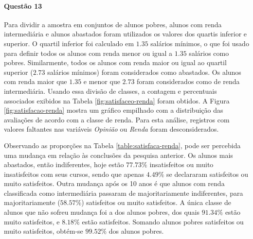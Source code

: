 \documentclass[10pt,a4paper,oneside]{article}
\begin{document}

\FloatBarrier

\paragraph{Questão 13}

Para dividir a amostra em conjuntos de alunos pobres, alunos com renda intermediária e alunos abastados foram utilizados os valores dos quartis inferior e superior. O quartil inferior foi calculado em $1.35$ salários mínimos, o que foi usado para definir todos os alunos com renda menor ou igual a $1.35$ salários como pobres. Similarmente, todos os alunos com renda maior ou igual ao quartil superior ($2.73$ salários mínimos) foram considerados como abastados. Os alunos com renda maior que $1.35$ e menor que $2.73$ foram considerados como de renda intermediária. Usando essa divisão de classes, a contagem e percentuais associados exibidos na Tabela \ref{fig:satisfaceo-renda} foram obtidos. A Figura \ref{fig:satisfacao-renda} mostra um gráfico empilhado com a distribuição das avaliações de acordo com a classe de renda. Para esta análise, registros com valores faltantes nas variáveis \textit{Opinião} ou \textit{Renda} foram desconsiderados.


Observando as proporções na Tabela \ref{table:satisfaca-renda}, pode ser percebida uma mudança em relação às conclusões da pesquisa anterior. Os alunos mais abastados, então indiferentes, hoje estão $77.73\%$ insatisfeitos ou muito insatisfeitos com seus cursos, sendo que apenas $4.49\%$ se declararam satisfeitos ou muito satisfeitos. Outra mudança após os 10 anos é que alunos com renda classificada como intermediária passaram de majoritariamente indiferentes, para majoritariamente ($58.57\%$) satisfeitos ou muito satisfeitos. A única classe de alunos que não sofreu mudança foi a dos alunos pobres, dos quais $91.34\%$ estão muito satisfeitos, e $8.18\%$ estão satisfeitos. Somando alunos pobres satisfeitos ou muito satisfeitos, obtém-se $99.52\%$ dos alunos pobres.
\end{document}
